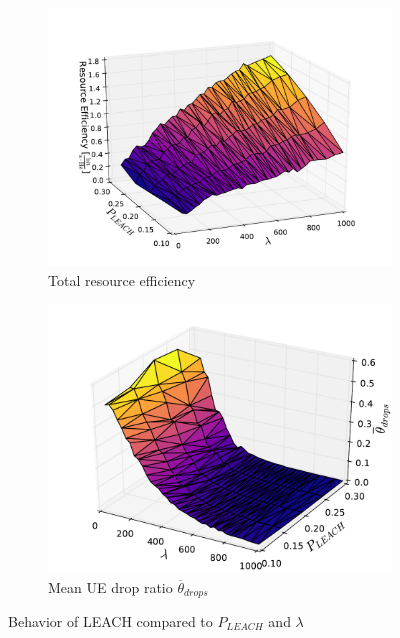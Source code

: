 \begin{figure}
\begin{subfigure}[b]{0.5\linewidth}
    \label{fig:LEACH_8} 
    \vspace{4ex}
  \end{subfigure} 
  \begin{subfigure}[b]{0.5\linewidth}
    \centering
    \captionsetup{justification=centering}
    \includegraphics[width=1\linewidth]{figures/LEACH_9} 
    \caption{Total resource efficiency} 
    \label{fig:LEACH_9} 
  \end{subfigure}%
  \begin{subfigure}[b]{0.5\linewidth}
    \centering
    \captionsetup{justification=centering}
    \includegraphics[width=1\linewidth]{figures/LEACH_10} 
    \caption{Mean UE drop ratio $\overline{\theta}_{drops}$} 
    \label{fig:LEACH_10} 
  \end{subfigure} 
  \caption{Behavior of LEACH compared to $P_{LEACH}$ and $\lambda$}
  \label{fig:pretty_results_LEACH} 
\end{figure}


